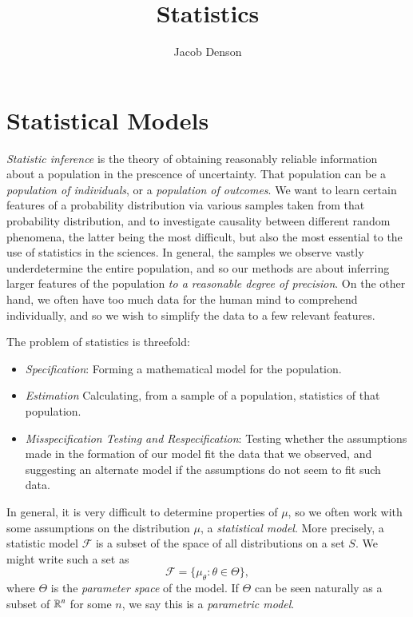 

\title{Statistics}
\author{Jacob Denson}



\maketitle
\tableofcontents
{}

\chapter{Statistical Models}

\emph{Statistic inference} is the theory of obtaining reasonably reliable information about a population in the prescence of uncertainty. That population can be a \emph{population of individuals}, or a \emph{population of outcomes}. We want to learn certain features of a probability distribution via various samples taken from that probability distribution, and to investigate causality between different random phenomena, the latter being the most difficult, but also the most essential to the use of statistics in the sciences. In general, the samples we observe vastly underdetermine the entire population, and so our methods are about inferring larger features of the population \emph{to a reasonable degree of precision}. On the other hand, we often have too much data for the human mind to comprehend individually, and so we wish to simplify the data to a few relevant features.

The problem of statistics is threefold:
%
\begin{itemize}
	\item \emph{Specification}: Forming a mathematical model for the population.
	\item \emph{Estimation} Calculating, from a sample of a population, statistics of that population.
	\item \emph{Misspecification Testing and Respecification}: Testing whether the assumptions made in the formation of our model fit the data that we observed, and suggesting an alternate model if the assumptions do not seem to fit such data.
\end{itemize}

In general, it is very difficult to determine properties of $\mu$, so we often work with some assumptions on the distribution $\mu$, a \emph{statistical model}. More precisely, a statistic model $\mathcal{F}$ is a subset of the space of all distributions on a set $S$. We might write such a set as
%
\[ \mathcal{F} = \{ \mu_\theta : \theta \in \Theta \}, \]
%
where $\Theta$ is the \emph{parameter space} of the model. If $\Theta$ can be seen naturally as a subset of $\operatorname{\mathbb{R}}^n$ for some $n$, we say this is a \emph{parametric model}.

